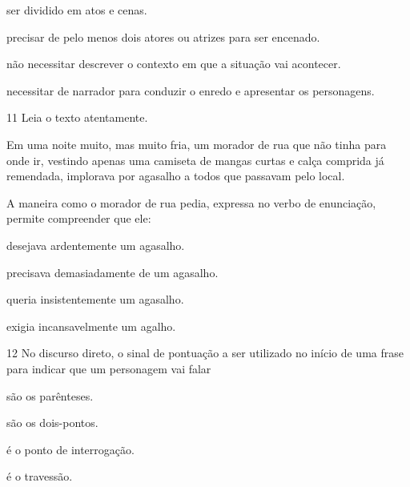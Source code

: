 \begin{escolha}
\item ser dividido em atos e cenas.

\item precisar de pelo menos dois atores ou atrizes para ser encenado.

\item não necessitar descrever o contexto em que a situação vai acontecer.

\item necessitar de narrador para conduzir o enredo e apresentar os personagens.
\end{escolha}

\num{11} Leia o texto atentamente.

\begin{myquote}
Em uma noite muito, mas muito fria, um morador de rua que não tinha para
onde ir, vestindo apenas uma camiseta de mangas curtas e calça comprida
já remendada, implorava por agasalho a todos que passavam pelo local.

\end{myquote}

A maneira como o morador de rua pedia, expressa no verbo de enunciação,
permite compreender que ele:

\begin{escolha}
\item desejava ardentemente um agasalho.

\item precisava demasiadamente de um agasalho.

\item queria insistentemente um agasalho.

\item exigia incansavelmente um agalho.
\end{escolha}

\num{12} No discurso direto, o sinal de pontuação a ser utilizado no início
de uma frase para indicar que um personagem vai falar

\begin{escolha}
\item são os parênteses.

\item são os dois-pontos.

\item é o ponto de interrogação.

\item é o travessão.
\end{escolha}

